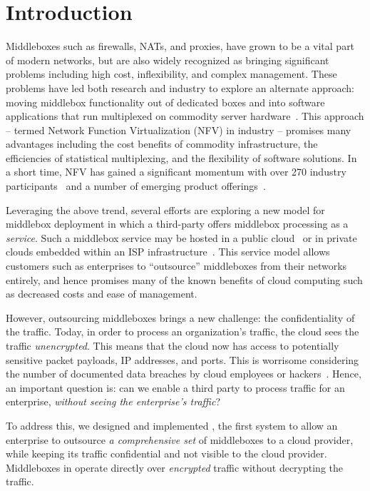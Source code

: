
\section{Introduction}\label{sec:intro}

Middleboxes such as firewalls, NATs, and proxies, have grown to be a vital part of modern networks, but are 
also widely recognized as bringing significant problems including high cost, inflexibility, and complex management.  
These problems have led both research and industry to explore an alternate approach: moving middlebox functionality out of dedicated boxes and into 
software applications that run multiplexed on commodity server hardware~\cite{mb-manifesto,comb,aplomb,opennf,clickos,flowtags,etsi-nfv,domain20,opnfv}.
This approach -- termed Network Function Virtualization (NFV) in industry -- promises many advantages including the cost benefits of commodity infrastructure, 
the efficiencies of statistical multiplexing, and the flexibility of software solutions. 
In a short time, NFV has gained a significant momentum with over 270 industry participants~\cite{etsi-nfv} and a number of emerging product offerings~\cite{brocade,dell,juniper}.

Leveraging the above trend, several efforts are exploring a new model for middlebox deployment in which a third-party offers middlebox processing as a  
\emph{service}.
Such a middlebox service may be hosted in a public cloud~\cite{aplomb,zscaler,aryaka} or in private clouds embedded within an ISP 
infrastructure~\cite{domain20, telefonica}.  
This service model allows customers such as enterprises to ``outsource'' middleboxes from their networks entirely, and hence promises many of the known benefits of cloud computing  such as decreased costs and ease of management.%

However, outsourcing middleboxes brings a new challenge: the confidentiality of the traffic. 
Today, in order to process an organization's traffic, the cloud sees the traffic {\em unencrypted}.  This means that the cloud 
now has access to potentially sensitive packet payloads,  IP addresses, and ports. This is 
worrisome considering the number of documented data breaches by cloud employees or hackers~\cite{PrivacyRecords,databreach}.
Hence, an important question is: can we enable a third party to process traffic for an enterprise, {\em without seeing the enterprise's traffic}?

To address this, we designed and implemented \sys, the first system to allow an enterprise to outsource {\it a comprehensive set} of middleboxes  to a cloud provider, while keeping its traffic confidential and not visible to the cloud provider. 
Middleboxes in \sys operate directly over {\it encrypted} traffic without decrypting the traffic. 


